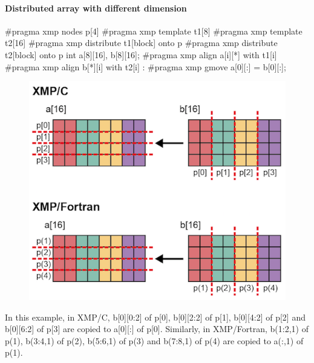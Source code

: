 \paragraph{Distributed array with different dimension}

\begin{XCexample}
#pragma xmp nodes p[4]
#pragma xmp template t1[8]
#pragma xmp template t2[16]
#pragma xmp distribute t1[block] onto p
#pragma xmp distribute t2[block] onto p
int a[8][16], b[8][16];
#pragma xmp align a[i][*] with t1[i]
#pragma xmp align b[*][i] with t2[i]
     :
#pragma xmp gmove
  a[0][:] = b[0][:];
\end{XCexample}


\begin{figure}
  \centering
  \includegraphics{figs/gmove_different.png}
\end{figure}

In this example, in XMP/C, b[0][0:2] of p[0], b[0][2:2] of p[1],
b[0][4:2] of p[2] and b[0][6:2] of p[3] are copied to a[0][:] of
p[0]. Similarly, in XMP/Fortran, b(1:2,1) of p(1), b(3:4,1) of p(2),
b(5:6,1) of p(3) and b(7:8,1) of p(4) are copied to a(:,1) of p(1).

